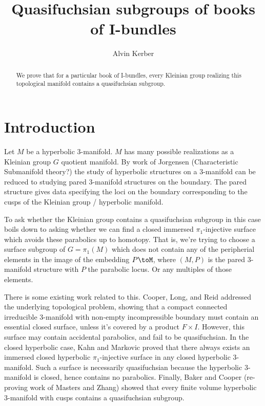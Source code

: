 \documentclass[12pt]{amsart}
\theoremstyle{definition}
\begin{document}
\title{Quasifuchsian subgroups of books of I-bundles}

\author{Alvin Kerber}

\begin{abstract}
We prove that for a particular book of I-bundles, every Kleinian group
realizing this topological manifold contains a quasifuchsian subgroup.
\end{abstract}

\maketitle
\section{Introduction}

Let $M$ be a hyperbolic 3-manifold. $M$ has many possible realizations as
a Kleinian group $G$ quotient manifold. By work of Jorgensen (Characteristic
Submanifold theory?) the study of hyperbolic structures on a 3-manifold can be
reduced to studying pared 3-manifold structures on the boundary. The pared
structure gives data specifying the loci on the boundary corresponding to the
cusps of the Kleinian group / hyperbolic manifold.

To ask whether the Kleinian group contains a quasifuchsian subgroup in this
case boils down to asking whether we can find a closed immersed
$\pi_1$-injective surface which avoids these parabolics up to homotopy. That
is, we're trying to choose a surface subgroup of $G=\pi_1(M)$ which does not
contain any of the peripherial elements in the image of the embedding $P\toM$,
where $(M,P)$ is the pared 3-manifold structure with $P$ the parabolic locus.
Or any multiples of those elements.

There is some existing work related to this. Cooper, Long, and Reid addressed
the underlying topological problem, showing that a compact connected
irreducible 3-manifold with non-empty incompressible boundary  must contain an
essential closed surface, unless it's covered by a product $F\times I$.
However, this surface may contain accidental parabolics, and fail to be
quasifuchsian.  In the closed hyperbolic case, Kahn and Markovic proved that
there always exists an immersed closed hyperbolic $\pi_1$-injective surface in
any closed hyperbolic 3-manifold. Such a surface is necessarily quasifuchsian
because the hyperbolic 3-manifold is closed, hence contains no parabolics.
Finally, Baker and Cooper (re-proving work of Masters and Zhang) showed that
every finite volume hyperbolic 3-manifold with cusps contains a quasifuchsian
subgroup.
\end{document}
